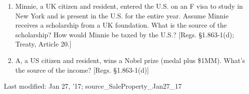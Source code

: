 \begin{select}
\begin{enumerate}
	\item Minnie, a UK citizen and resident, entered the U.S. on an F visa to study in New York and is present in the U.S. for the entire year.  Assume Minnie receives a scholarship from a UK foundation.  What is the source of the scholarship?  How would Minnie be taxed by the U.S.? [Regs. \S 1.863-1(d); Treaty, Article 20.]

	\item A, a US citizen and resident, wins a Nobel prize (medal plus \$1MM).  What's the source of the income?  [Regs. \S 1.863-1(d)]

			\end{enumerate}	
	\end{select}



\begin{framed}
Last modified: Jan 27, '17; source\_SaleProperty\_Jan27\_17
\end{framed}